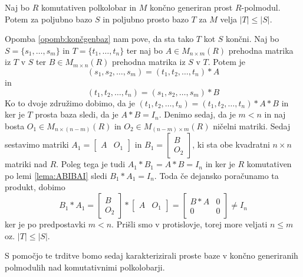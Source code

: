 \documentclass[mat1]{fmfdelo}
\newcommand{\abs}[1]{\ensuremath{\lvert #1 \rvert}}
\begin{document}
\begin{trditev}\label{trd:kardprostvsneprostbaz}
	Naj bo $R$ komutativen polkolobar in $M$ končno generiran prost $R$-polmodul. Potem za poljubno bazo $S$ in poljubno prosto bazo $T$ za $M$ velja $\abs{T}\leq\abs{S}$.
\end{trditev}

\begin{dokaz}
	Opomba \ref{opomb:končgenbaz} nam pove, da sta tako $T$ kot $S$ končni. Naj bo $S = \{s_1,\ldots, s_m\}$ in $T =\{t_1, \ldots, t_n\}$ ter naj bo $A \in M_{n\times m}(R)$ prehodna matrika iz $T$ v $S$ ter $B\in M_{m\times n}(R)$ prehodna matrika iz $S$ v $T$. Potem je $$(s_1, s_2, \ldots, s_m) = (t_1, t_2, \ldots, t_n)*A$$ in $$(t_1, t_2, \ldots, t_n) = (s_1, s_2, \ldots, s_m)*B$$ Ko to dvoje združimo dobimo, da je $(t_1, t_2, \ldots, t_n) = (t_1, t_2, \ldots, t_n)*A*B$ in ker je $T$ prosta baza sledi, da je $A*B = I_n$. Denimo sedaj, da je $m < n$ in naj bosta $O_1\in M_{n\times (n-m)}(R)$ in $O_2\in M_{(n-m)\times m}(R)$ ničelni matriki. Sedaj sestavimo matriki $A_1 = \begin{bmatrix}
A & O_1
\end{bmatrix}$ in $B_1 = \begin{bmatrix}
B \\
 O_2
\end{bmatrix}$, ki sta obe kvadratni $n\times n$ matriki nad $R$. Poleg tega je tudi $A_1*B_1 = A*B = I_n$ in ker je $R$ komutativen po lemi \ref{lema:ABIBAI} sledi $B_1*A_1 = I_n$. Toda če dejansko poračunamo ta produkt, dobimo $$B_1*A_1 = \begin{bmatrix}
B \\
O_2
\end{bmatrix} * \begin{bmatrix}
A & O_1
\end{bmatrix} = \begin{bmatrix}
B*A & 0 \\
0 & 0
\end{bmatrix} \neq I_n$$ ker je po predpostavki $m < n$. Prišli smo v protislovje, torej more veljati $n \leq m$ oz. $\abs{T} \leq \abs{S}$.
\end{dokaz}

S pomočjo te trditve bomo sedaj karakterizirali proste baze v končno generiranih polmodulih nad komutativnimi polkolobarji.
\end{document}
